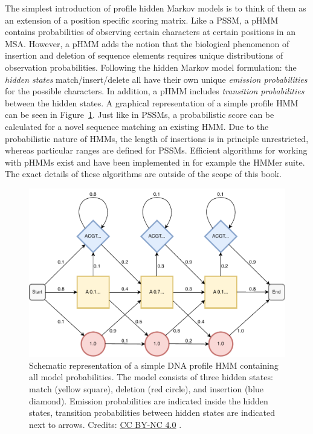 The simplest introduction of profile hidden Markov models is to think of them as an extension of a position specific scoring matrix. Like a PSSM, a pHMM contains probabilities of observing certain characters at certain positions in an MSA. However, a pHMM adds the notion that the biological phenomenon of insertion and deletion of sequence elements requires unique distributions of observation probabilities. Following the hidden Markov model formulation: the \textit{hidden states} match/insert/delete all have their own unique \textit{emission probabilities} for the possible characters. In addition, a pHMM includes \textit{transition probabilities} between the  hidden states. A graphical representation of a simple profile HMM can be seen in Figure~\ref{simple_hmm}. Just like in PSSMs, a probabilistic score can be calculated for a novel sequence matching an existing HMM.
Due to the probabilistic nature of HMMs, the length of insertions is in principle unrestricted, whereas particular ranges are defined for PSSMs.
Efficient algorithms for working with pHMMs exist and have been implemented in for example the HMMer suite. The exact details of these algorithms are outside of the scope of this book.

\begin{figure}[!htbp]
\centering
\includegraphics[width=0.6\linewidth]{files/hmm-e0733ae4fec57ce5502f9917dc126281.pdf}
\caption[]{Schematic representation of a simple DNA profile HMM containing all model probabilities. The model consists of three hidden states: match (yellow square), deletion (red circle), and insertion (blue diamond). Emission probabilities are indicated inside the hidden states, transition probabilities between hidden states are indicated next to arrows.
Credits: \href{https://creativecommons.org/licenses/by-nc/4.0/}{CC BY-NC 4.0} \cite{own_2_2024}.}
\label{simple_hmm}
\end{figure}

